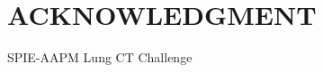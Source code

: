 \documentclass[letterpaper, 10 pt, conference]{ieeeconf}  %
\begin{document}
\addtolength{\textheight}{-12cm}   %







\section*{ACKNOWLEDGMENT}

SPIE-AAPM Lung CT Challenge

\begin{thebibliography}{99}

\end{thebibliography}
\end{document}
